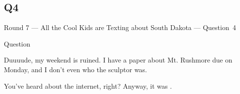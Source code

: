 \documentclass[11pt]{beamer}
\begin{document}
\subsection*{Q4}
\begin{frame}[t]{Round 7 --- All the Cool Kids are Texting about South Dakota --- \mbox{Question 4}}
\begin{block}{Question}

\begin{minipage}{0.9\textwidth}
\begin{mdframed}[
    roundcorner=7pt,
    backgroundcolor=black!5,
    linecolor=black!5,
    fontcolor=black,
    ignorelastdescenders]
\begin{flushleft}
{\small{}\selectfont{}
Duuuude, my weekend is ruined.  I have a paper about Mt. Rushmore due on Monday, and I don't even who the sculptor was.
}
\end{flushleft}
\end{mdframed}
\end{minipage}

\hfill{}\begin{minipage}{0.9\textwidth}
\begin{mdframed}[
    roundcorner=7pt,
    backgroundcolor=blue!80!white,
    linecolor=blue!80!white,
    fontcolor=white,
    ignorelastdescenders]
\begin{flushleft}
{\small{}\selectfont{}
You've heard about the internet, right? Anyway, it was \textunderscore{}\textunderscore{}\textunderscore{}\textunderscore{}\textunderscore{}\textunderscore{} \textunderscore{}\textunderscore{}\textunderscore{}\textunderscore{}\textunderscore{}\textunderscore{}.
}
\end{flushleft}
\end{mdframed}
\end{minipage}
\end{block}
\end{frame}
\end{document}
